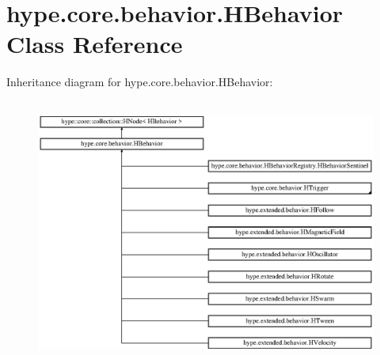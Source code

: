 \hypertarget{classhype_1_1core_1_1behavior_1_1_h_behavior}{\section{hype.\-core.\-behavior.\-H\-Behavior Class Reference}
\label{classhype_1_1core_1_1behavior_1_1_h_behavior}
}
Inheritance diagram for hype.\-core.\-behavior.\-H\-Behavior\-:\begin{figure}[H]
\begin{center}
\leavevmode
\includegraphics[height=8.774929cm]{classhype_1_1core_1_1behavior_1_1_h_behavior}
\end{center}
\end{figure}
